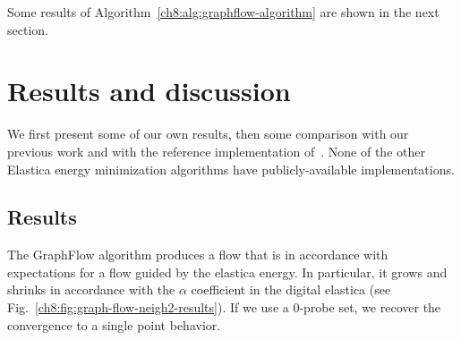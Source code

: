 \documentclass[runningheads]{llncs}
\begin{document}
Some results of Algorithm~\ref{ch8:alg:graphflow-algorithm} are shown in the next section.

\section{Results and discussion}
We first present some of our own results, then some comparison with our previous work and with the reference
implementation of~\cite{schoenemann09linear}. None of the other Elastica energy minimization algorithms have
publicly-available implementations.

\subsection{Results}
The GraphFlow algorithm produces a flow that is in accordance with expectations for a flow guided by the elastica
energy. In particular, it grows and shrinks in accordance with the $\alpha$ coefficient in the digital elastica
(see Fig.~\ref{ch8:fig:graph-flow-neigh2-results}). If we use a $0$-probe set, we recover the convergence to a single point
behavior.
\end{document}
